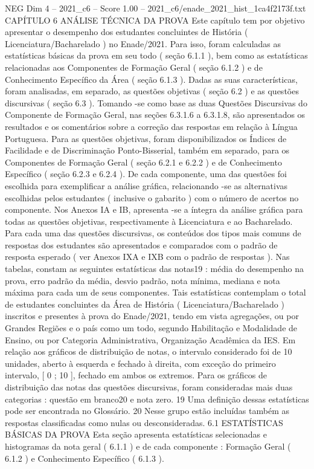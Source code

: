 \begin{textsample}{NEG Dim 4 – 2021\_c6 – Score 1.00 – 2021\_c6/enade\_2021\_hist\_1ca4f2173f.txt}  \label{ex:f4_neg_292}
CAPÍTULO 6 ANÁLISE TÉCNICA DA PROVA Este capítulo tem por objetivo apresentar o desempenho dos estudantes concluintes de História ( Licenciatura/Bacharelado ) no Enade/2021.
Para isso, foram calculadas as estatísticas básicas da prova em seu todo ( seção 6.1.1 ), bem como as estatísticas relacionadas aos Componentes de Formação Geral ( seção 6.1.2 ) e de Conhecimento Específico da Área ( seção 6.1.3 ).
Dadas as suas características, foram analisadas, em separado, as questões objetivas ( seção 6.2 ) e as questões discursivas ( seção 6.3 ).
Tomando -se como base as duas Questões Discursivas do Componente de Formação Geral, nas seções 6.3.1.6 a 6.3.1.8, são apresentados os resultados e os comentários sobre a correção das respostas em relação à Língua Portuguesa.
Para as questões objetivas, foram disponibilizados os Índices de Facilidade e de Discriminação Ponto-Bisserial, também em separado, para os Componentes de Formação Geral ( seção 6.2.1 e 6.2.2 ) e de Conhecimento Específico ( seção 6.2.3 e 6.2.4 ).
De cada componente, uma das questões foi escolhida para exemplificar a análise gráfica, relacionando -se as alternativas escolhidas pelos estudantes ( inclusive o gabarito ) com o número de acertos no componente.
Nos Anexos IA e IB, apresenta -se a íntegra da análise gráfica para todas as questões objetivas, respectivamente à Licenciatura e ao Bacharelado.
Para cada uma das questões discursivas, os conteúdos dos tipos mais comuns de respostas dos estudantes são apresentados e comparados com o padrão de resposta esperado ( ver Anexos IXA e IXB com o padrão de respostas ).
Nas tabelas, constam as seguintes estatísticas das notas19 : média do desempenho na prova, erro padrão da média, desvio padrão, nota mínima, mediana e nota máxima para cada um de seus componentes.
Tais estatísticas contemplam o total de estudantes concluintes da Área de História ( Licenciatura/Bacharelado ) inscritos e presentes à prova do Enade/2021, tendo em vista agregações, ou por Grandes Regiões e o país como um todo, segundo Habilitação e Modalidade de Ensino, ou por Categoria Administrativa, Organização Acadêmica da IES.
Em relação aos gráficos de distribuição de notas, o intervalo considerado foi de 10 unidades, aberto à esquerda e fechado à direita, com exceção do primeiro intervalo, [ 0 ; 10 ], fechado em ambos os extremos.
Para os gráficos de distribuição das notas das questões discursivas, foram consideradas mais duas categorias : questão em branco20 e nota zero. 19 Uma definição dessas estatísticas pode ser encontrada no Glossário. 20 Nesse grupo estão incluídas também as respostas classificadas como nulas ou desconsideradas. 6.1 ESTATÍSTICAS BÁSICAS DA PROVA Esta seção apresenta estatísticas selecionadas e histogramas da nota geral ( 6.1.1 ) e de cada componente : Formação Geral ( 6.1.2 ) e Conhecimento Específico ( 6.1.3 ).

\end{textsample}
